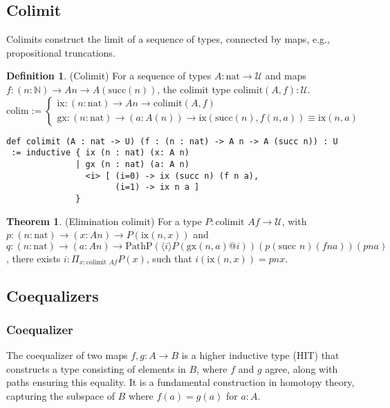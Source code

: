 \documentclass{article}
\theoremstyle{definition}
\newtheorem{theorem}{Theorem}
\newtheorem{definition}{Definition}
\begin{document}
\newpage
\subsection{Colimit}
Colimits construct the limit of a sequence of types, connected by maps,
e.g., propositional truncations.

\begin{definition} (Colimit)
For a sequence of types \( A : \text{nat} \to \mathcal{U} \) and
maps \( f : (n : \mathbb{N}) \to A n \to A(\text{succ}(n)) \),
the colimit type \( \text{colimit}(A,f) : \mathcal{U} \).
\[
\text{colim} :=
\begin{cases}
\text{ix} : (n : \text{nat}) \to A n \to \text{colimit}(A,f) \\
\text{gx} : (n : \text{nat}) \to (a : A(n)) \to \text{ix} (\text{succ}(n),f(n,a)) \equiv \text{ix}(n,a)
\end{cases}
\]
\begin{lstlisting}
def colimit (A : nat -> U) (f : (n : nat) -> A n -> A (succ n)) : U
 := inductive { ix (n : nat) (x: A n)
              | gx (n : nat) (a: A n)
                <i> [ (i=0) -> ix (succ n) (f n a),
                      (i=1) -> ix n a ]
              }
\end{lstlisting}
\end{definition}

\begin{theorem} (Elimination \( \text{colimit} \))
For a type \( P : \text{colimit } A f \to \mathcal{U} \),
with \( p : (n : \text{nat}) \to (x : A n) \to P(\text{ix}(n, x)) \)
and \( q : (n : \text{nat}) \to (a : A n) \to \text{PathP} (\langle i \rangle P(\text{gx}(n, a) @ i)) (p (\text{succ } n) (f n a)) (p n a) \),
there exists \( i : \Pi_{x:\text{colimit } A f} P(x) \), such that \( i(\text{ix}(n, x)) = p n x \).
\end{theorem}

\newpage
\subsection{Coequalizers}
\subsubsection*{Coequalizer}
The coequalizer of two maps \( f, g : A \to B \) is a higher inductive
type (HIT) that constructs a type consisting of elements in \( B \),
where \( f \) and \( g \) agree, along with paths ensuring this equality.
It is a fundamental construction in homotopy theory,
capturing the subspace of \( B \) where \( f(a) = g(a) \) for \( a : A \).
\end{document}
